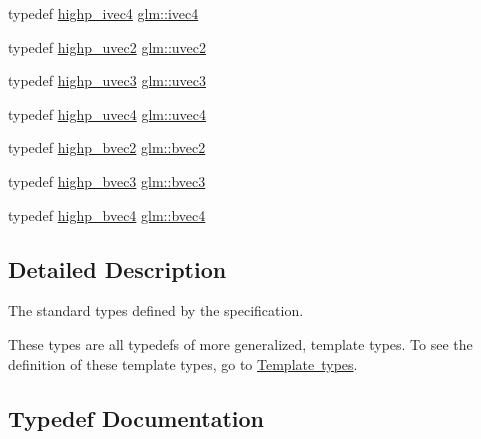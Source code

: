 \begin{DoxyCompactItemize}
\item 
typedef \mbox{\hyperlink{group__core__precision_ga9303c2a9e1f1e761961eeecbcda2d34f}{highp\+\_\+ivec4}} \mbox{\hyperlink{group__core__types_gaa4560ddc50320ea8f8a70d5c9c249fea}{glm\+::ivec4}}
\item 
typedef \mbox{\hyperlink{group__core__precision_ga386eaa1579a0f5ad51cd7d8fcd52ec16}{highp\+\_\+uvec2}} \mbox{\hyperlink{group__core__types_gafd2041b45eff671aa8899d2c2835eee9}{glm\+::uvec2}}
\item 
typedef \mbox{\hyperlink{group__core__precision_ga90ab9c4694f5af23c7dcd4eb9e47e255}{highp\+\_\+uvec3}} \mbox{\hyperlink{group__core__types_gac4ba593917841b859ba1683b8b52b8fa}{glm\+::uvec3}}
\item 
typedef \mbox{\hyperlink{group__core__precision_gaced82ea2e726f079d4d72cf180a75b8b}{highp\+\_\+uvec4}} \mbox{\hyperlink{group__core__types_ga1c426d19627b32b14f0089f7f4ba7b1d}{glm\+::uvec4}}
\item 
typedef \mbox{\hyperlink{group__core__precision_gaf76ced5823e8aace6bd257fac6c250cb}{highp\+\_\+bvec2}} \mbox{\hyperlink{group__core__types_ga7523cf292181cf7daef3aa0a3267d8e3}{glm\+::bvec2}}
\item 
typedef \mbox{\hyperlink{group__core__precision_gac35c0ff5b9eead09e905b4aa09d1e954}{highp\+\_\+bvec3}} \mbox{\hyperlink{group__core__types_ga3f07d6d37fc6fe875170fd5799685bcf}{glm\+::bvec3}}
\item 
typedef \mbox{\hyperlink{group__core__precision_ga12155cf93fb8fea5d9c4c7e2d72aed4e}{highp\+\_\+bvec4}} \mbox{\hyperlink{group__core__types_ga6bb211b3d3bebae3867548d5673ca5cd}{glm\+::bvec4}}
\end{DoxyCompactItemize}


\subsection{Detailed Description}
The standard types defined by the specification. 

These types are all typedefs of more generalized, template types. To see the definition of these template types, go to \mbox{\hyperlink{group__core__template}{Template types}}. 

\subsection{Typedef Documentation}
\mbox{\label{group__core__types_ga7523cf292181cf7daef3aa0a3267d8e3}} 
